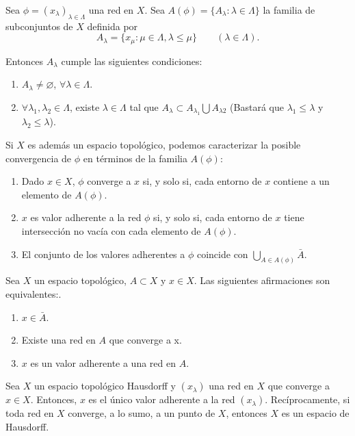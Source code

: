 Sea $\phi = (x_{\lambda})_{\lambda\in\Lambda}$ una red en $X$. Sea $A(\phi) = \{ A_{\lambda} : \lambda\in\Lambda\}$ la familia de subconjuntos de $X$ definida por
\begin{equation}
A_{\lambda} = \{x_{\mu} : \mu\in\Lambda, \lambda\leq\mu\} \qquad (\lambda\in\Lambda).
\end{equation}

Entonces $A_{\lambda}$ cumple las siguientes condiciones: 
\begin{enumerate}
	\item $A_{\lambda} \neq \varnothing$, $\forall\lambda\in\Lambda$.
	\item $\forall \lambda_{1},\lambda_{2}\in\Lambda$, existe $\lambda\in\Lambda$ tal que $A_{\lambda}\subset A_{\lambda_{1}}\bigcup A_{\lambda{2}}$ (Bastará que $\lambda_{1}\leq\lambda$ y $\lambda_{2}\leq\lambda$).
\end{enumerate}

Si $X$ es además un espacio topológico, podemos caracterizar la posible convergencia de $\phi$ en términos de la familia $A(\phi)$:

\begin{enumerate}
 \item Dado $x\in X$, $\phi$ converge a $x$ si, y solo si, cada entorno de $x$ contiene a un elemento de $A(\phi)$.
 \item $x$ es valor adherente a la red $\phi$ si, y solo si, cada entorno de $x$ tiene intersección no vacía con cada elemento de $A(\phi)$.
 \item El conjunto de los valores adherentes a $\phi$ coincide con $\bigcup_{A\in A(\phi)} \bar{A}$.
  
\end{enumerate}

\begin{proposicion}
Sea $X$ un espacio topológico, $A\subset X$ y $x\in X$. Las siguientes afirmaciones son equivalentes:.
\begin{enumerate}
	\item $x\in\bar{A}$.
	\item Existe una red en $A$ que converge a x.
	\item $x$ es un valor adherente a una red en $A$.
\end{enumerate}
\end{proposicion}

\begin{proposicion}
Sea $X$ un espacio topológico Hausdorff y $(x_{\lambda})$ una red en $X$ que converge a $x\in X$. Entonces, $x$ es el único valor adherente a la red $(x_{\lambda})$. Recíprocamente, si toda red en $X$ converge, a lo sumo, a un punto de $X$, entonces $X$ es un espacio de Hausdorff. 
\end{proposicion}

